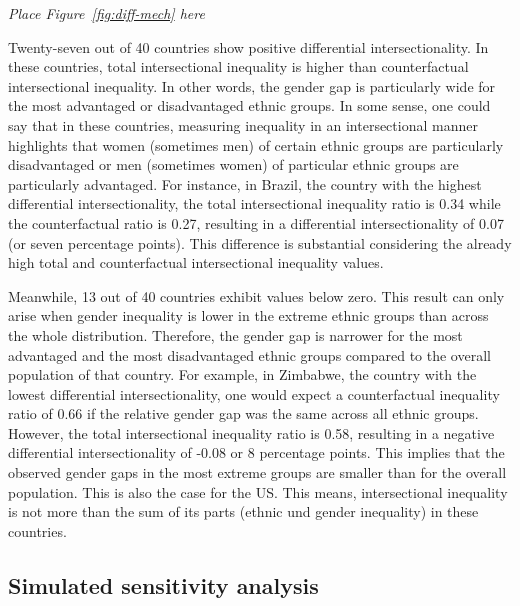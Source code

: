 \begin{center}
    \textit{Place Figure~\ref{fig:diff-mech} here}
\end{center}

Twenty-seven out of 40 countries show positive differential intersectionality. In these countries, total intersectional inequality is higher than counterfactual intersectional inequality. In other words, the gender gap is particularly wide for the most advantaged or disadvantaged ethnic groups. In some sense, one could say that in these countries, measuring inequality in an intersectional manner highlights that women (sometimes men) of certain ethnic groups are particularly disadvantaged or men (sometimes women) of particular ethnic groups are particularly advantaged. For instance, in Brazil, the country with the highest differential intersectionality, the total intersectional inequality ratio is 0.34 while the counterfactual ratio is 0.27, resulting in a differential intersectionality of 0.07 (or seven percentage points). This difference is substantial considering the already high total and counterfactual intersectional inequality values.

Meanwhile, 13 out of 40 countries exhibit values below zero. This result can only arise when gender inequality is lower in the extreme ethnic groups than across the whole distribution. Therefore, the gender gap is narrower for the most advantaged and the most disadvantaged ethnic groups compared to the overall population of that country. For example, in Zimbabwe, the country with the lowest differential intersectionality, one would expect a counterfactual inequality ratio of 0.66 if the relative gender gap was the same across all ethnic groups. However, the total intersectional inequality ratio is 0.58, resulting in a negative differential intersectionality of -0.08 or 8 percentage points. This implies that the observed gender gaps in the most extreme groups are smaller than for the overall population. This is also the case for the US. This means, intersectional inequality is not more than the sum of its parts (ethnic und gender inequality) in these countries. 

\hypertarget{sensitivity}{%
\subsection{Simulated sensitivity analysis}\label{sensitivity}}


